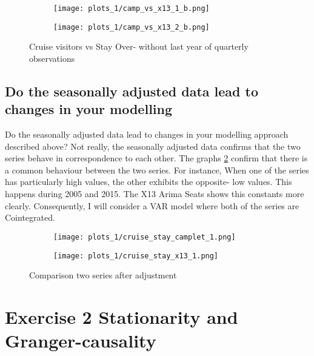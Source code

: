 \documentclass[11pt]{article}
\begin{document}
\begin{figure}[H]
    \centering
    \begin{subfigure}[t]{0.45\textwidth}
         \texttt{[image: plots\_1/camp\_vs\_x13\_1\_b.png]}
    \end{subfigure}
    \begin{subfigure}[t]{0.45\textwidth}
          \texttt{[image: plots\_1/camp\_vs\_x13\_2\_b.png]}
    \end{subfigure}
    \caption{Cruise visitors vs Stay Over- without last year of quarterly observations}
    \label{fig:minus4months}
\end{figure}


\subsection{Do the seasonally adjusted data lead to changes in your modelling}
Do the seasonally adjusted data lead to changes in your modelling approach described above? Not really, the seasonally adjusted data confirms that the two series behave in correspondence to each other. The graphs \ref{fig:behaviourafteradjs} confirm that there is a common behaviour between the two series. For instance, When one of the series has particularly high values, the other exhibits the opposite- low values. This happens during 2005 and 2015. The X13 Arima Seats shows this constants more clearly. Consequently, I will consider a VAR model where both of the series are Cointegrated.



\begin{figure}[h!]
    \centering
    \begin{subfigure}[t]{0.45\textwidth}
         \texttt{[image: plots\_1/cruise\_stay\_camplet\_1.png]}
    \end{subfigure}
    \begin{subfigure}[t]{0.45\textwidth}
          \texttt{[image: plots\_1/cruise\_stay\_x13\_1.png]}
    \end{subfigure}
    \caption{Comparison two series after adjustment}
    \label{fig:behaviourafteradjs}
\end{figure}



\newpage
\section{Exercise 2 Stationarity and Granger-causality}
\end{document}
